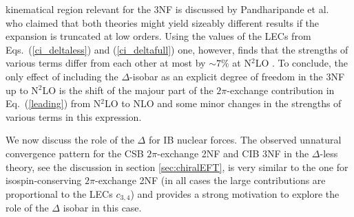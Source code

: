 \documentclass[aps,rmp,nofootinbib,twocolumn,floatfix]{revtex4}
\begin{document}
  kinematical region relevant for the 3NF is discussed by Pandharipande et 
al.~\cite{Pandharipande:2005sx} who claimed that both theories might yield 
sizeably different results if the expansion is truncated at low orders. Using
the values of the LECs from Eqs.~(\ref{ci_deltaless}) and (\ref{ci_deltafull}) one,
however, finds that the strengths of various terms differ from each other at
most by $\sim 7\%$ at N$^2$LO \cite{Epelbaum:2007sq}.  To conclude, the only effect of
including the $\Delta$-isobar as an explicit degree of freedom in the 3NF up to
N$^2$LO is the shift of the majour part of the $2\pi$-exchange contribution 
in Eq.~(\ref{leading}) from
N$^2$LO to NLO and some minor changes in the strengths of various terms in
this expression. 

We now discuss the role of the $\Delta$ for IB nuclear
forces. The observed unnatural convergence pattern for the CSB $2\pi$-exchange
2NF and CIB 3NF in the $\Delta$-less theory, see the discussion in section \ref{sec:chiralEFT},
is very similar to the one for isospin-conserving $2\pi$-exchange 2NF (in all
cases the large contributions are proportional to the LECs $c_{3,4}$) and
provides a strong motivation to explore the role of the $\Delta$ isobar in
this case. 
\end{document}
